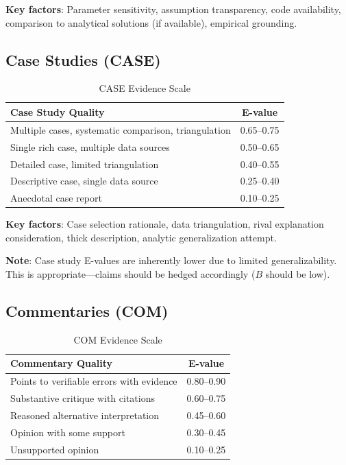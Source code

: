 \documentclass[11pt,a4paper]{article}
\begin{document}
\textbf{Key factors}: Parameter sensitivity, assumption transparency, code availability, comparison to analytical solutions (if available), empirical grounding.

\subsection{Case Studies (CASE)}

\begin{table}[h]
\centering
\caption{CASE Evidence Scale}
\label{tab:case-scale}
\begin{tabular}{lc}
\toprule
\textbf{Case Study Quality} & \textbf{E-value} \\
\midrule
Multiple cases, systematic comparison, triangulation & 0.65--0.75 \\
Single rich case, multiple data sources & 0.50--0.65 \\
Detailed case, limited triangulation & 0.40--0.55 \\
Descriptive case, single data source & 0.25--0.40 \\
Anecdotal case report & 0.10--0.25 \\
\bottomrule
\end{tabular}
\end{table}

\textbf{Key factors}: Case selection rationale, data triangulation, rival explanation consideration, thick description, analytic generalization attempt.

\textbf{Note}: Case study E-values are inherently lower due to limited generalizability. This is appropriate---claims should be hedged accordingly ($B$ should be low).

\subsection{Commentaries (COM)}

\begin{table}[h]
\centering
\caption{COM Evidence Scale}
\label{tab:com-scale}
\begin{tabular}{lc}
\toprule
\textbf{Commentary Quality} & \textbf{E-value} \\
\midrule
Points to verifiable errors with evidence & 0.80--0.90 \\
Substantive critique with citations & 0.60--0.75 \\
Reasoned alternative interpretation & 0.45--0.60 \\
Opinion with some support & 0.30--0.45 \\
Unsupported opinion & 0.10--0.25 \\
\bottomrule
\end{tabular}
\end{table}
\end{document}
